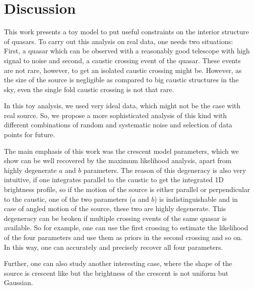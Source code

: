 \section{Discussion}

This work presents a toy model to put useful constraints on the interior structure of quasars. To carry out this analysis on real data, one needs two situations: First, a quasar which can be observed with a reasonably good telescope with high signal to noise and second, a caustic crossing event of the quasar. These events are not rare, however, to get an isolated caustic crossing might be. However, as the size of the source is negligible as compared to big caustic structures in the sky, even the single fold caustic crossing is not that rare.

In this toy analysis, we used very ideal data, which might not be the case with real source. So, we propose a more sophisticated analysis of this kind with different combinations of random and systematic noise and selection of data points for future.

The main emphasis of this work was the crescent model parameters, which we show can be well recovered by the maximum likelihood analysis, apart from highly degenerate $a$ and $b$ parameters. The reason of this degeneracy is also very intuitive, if one integrates parallel to the caustic to get the integrated 1D brightness profile, so if the motion of the source is either parallel or perpendicular to the caustic, one of the two parameters ($a$ and $b$) is indistinguishable and in case of angled motion of the source, these two are highly degenerate. This degeneracy can be broken if multiple crossing events of the same quasar is available. So for example, one can use the first crossing to estimate the likelihood of the four parameters and use them as priors in the second crossing and so on. In this way, one can accurately and precisely recover all four parameters.

Further, one can also study another interesting case, where the shape of the source is crescent like but the brightness of the crescent is not uniform but Gaussian.



